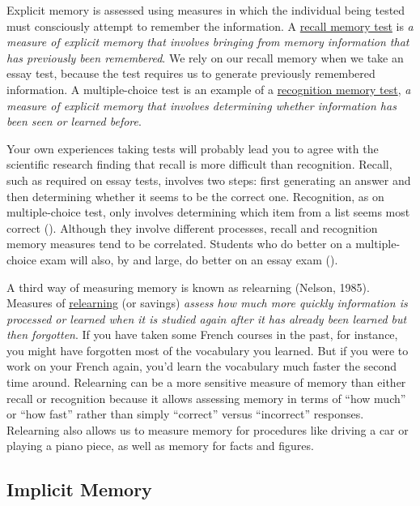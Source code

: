\documentclass[
]{krantz}
\begin{document}
Explicit memory is assessed using measures in which the individual being tested must consciously attempt to remember the information. A \hyperref[recall-memory-test]{recall memory test} is \emph{a measure of explicit memory that involves bringing from memory information that has previously been remembered}. We rely on our recall memory when we take an essay test, because the test requires us to generate previously remembered information. A multiple-choice test is an example of a \hyperref[recognition-memory-test]{recognition memory test}, \emph{a measure of explicit memory that involves determining whether information has been seen or learned before}.

Your own experiences taking tests will probably lead you to agree with the scientific research finding that recall is more difficult than recognition. Recall, such as required on essay tests, involves two steps: first generating an answer and then determining whether it seems to be the correct one. Recognition, as on multiple-choice test, only involves determining which item from a list seems most correct (). Although they involve different processes, recall and recognition memory measures tend to be correlated. Students who do better on a multiple-choice exam will also, by and large, do better on an essay exam ().

A third way of measuring memory is known as relearning (Nelson, 1985). Measures of \hyperref[relearning]{relearning} (or savings) \emph{assess how much more quickly information is processed or learned when it is studied again after it has already been learned but then forgotten}. If you have taken some French courses in the past, for instance, you might have forgotten most of the vocabulary you learned. But if you were to work on your French again, you'd learn the vocabulary much faster the second time around. Relearning can be a more sensitive measure of memory than either recall or recognition because it allows assessing memory in terms of ``how much'' or ``how fast'' rather than simply ``correct'' versus ``incorrect'' responses. Relearning also allows us to measure memory for procedures like driving a car or playing a piano piece, as well as memory for facts and figures.

\subsection*{Implicit Memory}\label{implicit-memory}
\end{document}
